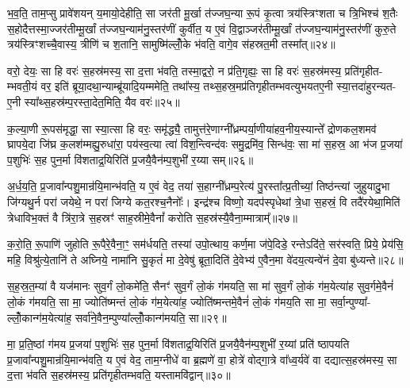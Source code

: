 भ॒व॒ति॒ ताम॒प्सु प्रावे॑शयन् य॒मायो॒देहीति॒ सा जर॑ती मू॒र्खा त॑ज्जघ॒न्या रू॒पं कृ॒त्वा त्रय॑स्त्रिꣳशता च त्रि॒भिश्च॑ श॒तैः स॒होदैत्तस्मा॒ज्जर॑तीम्मू॒र्खां त॑ज्जघ॒न्याम॑नु॒स्तर॑णीं कुर्वीत॒ य ए॒वं वि॒द्वाञ्जर॑तीम्मू॒र्खां त॑ज्जघ॒न्याम॑नु॒स्तर॑णीं कुरु॒ते त्रय॑स्त्रिꣳशच्चै॒वास्य॒ त्रीणि॑ च श॒तानि॒ सामुष्मि॑ल्लोँ॒के भ॑वति॒ वागे॒व स॑हस्रत॒मी तस्मा᳚त्॥२४॥

वरो॒ देयः॒ सा हि वरः॑ स॒हस्र॑मस्य॒ सा द॒त्ता भ॑वति॒ तस्मा॒द्वरो॒ न प्र॑ति॒गृह्यः॒ सा हि वरः॑ स॒हस्र॑मस्य॒ प्रति॑गृहीत- म्भवती॒यं वर॒ इति॑ ब्रूया॒दथा॒न्याम्ब्रू॑यादि॒यम्ममेति॒ तथा᳚स्य॒ तथ्स॒हस्र॒मप्र॑तिगृहीतम्भवत्युभयतए॒नी स्या॒त्तदा॑हुरन्यत- ए॒नी स्या᳚थ्स॒हस्र॑म्प॒रस्ता॒देत॒मिति॒ यैव वरः॑॥२५॥

क॒ल्या॒णी रू॒पस॑मृद्धा॒ सा स्या॒त्सा हि वरः॒ समृ॑द्ध्यै॒ तामुत्त॑रे॒णाग्नी᳚ध्रम्पर्या॒णीया॑हव॒नीय॒स्यान्ते᳚ द्रोणकल॒शमव॑ घ्रापये॒दा जि॑घ्र क॒लश॑म्मह्यु॒रुधा॑रा॒ पय॑स्व॒त्या त्वा॑ विश॒न्त्विन्द॑वः समु॒द्रमि॑व॒ सिन्ध॑वः॒ सा मा॑ स॒हस्र॒ आ भ॑ज प्र॒जया॑ प॒शुभिः॑ स॒ह पुन॒र्मा वि॑शताद्र॒यिरिति॑ प्र॒जयै॒वैन॑म्प॒शुभी॑ र॒य्या सम्॥२६॥

अ॒र्ध॒य॒ति॒ प्र॒जावा᳚न्पशु॒मान्र॑यि॒मान्भ॑वति॒ य ए॒वं वेद॒ तया॑ स॒हाग्नी᳚ध्रम्प॒रेत्य॑ पु॒रस्ता᳚त्प्र॒तीच्यां॒ तिष्ठ॑न्त्यां जुहुयादु॒भा जि॑ग्यथु॒र्न परा॑ जयेथे॒ न परा॑ जिग्ये कत॒रश्च॒नैनोः᳚। इन्द्र॑श्च विष्णो॒ यदप॑स्पृधेथां त्रे॒धा स॒हस्रं॒ वि तदै॑रयेथा॒मिति॑ त्रेधाविभ॒क्तं वै त्रि॑रा॒त्रे स॒हस्रꣳ॑ साह॒स्रीमे॒वैनां᳚ करोति स॒हस्र॑स्यै॒वैना॒म्मात्राम्᳚॥२७॥

क॒रो॒ति॒ रू॒पाणि॑ जुहोति रू॒पैरे॒वैना॒ꣳ॒ सम॑र्धयति॒ तस्या॑ उपो॒त्थाय॒ कर्ण॒मा ज॑पे॒दिडे॒ रन्ते\-ऽदि॑ते॒ सर॑स्वति॒ प्रिये॒ प्रेय॑सि॒ महि॒ विश्रु॑त्ये॒तानि॑ ते अघ्निये॒ नामा॑नि सु॒कृतं॑ मा दे॒वेषु॑ ब्रूता॒दिति॑ दे॒वेभ्य॑ ए॒वैन॒मा वे॑दय॒त्यन्वे॑नं दे॒वा बु॑ध्यन्ते॥२८॥

{\anuvakamend[{ए॒तदे॒तस्यां᳚ वी॒र्य॑मस्य त्रि॒भिश्च॑ द॒त्ता स॑हस्रत॒मी तस्मा॑दे॒व वरः॒ सम्मात्रा॒मेका॒न्नच॑त्वारि॒ꣳ॒शच्च॑॥६॥}]}

स॒ह॒स्र॒त॒म्या॑ वै यज॑मानः सुव॒र्गं लो॒कमे॑ति॒ सैनꣳ॑ सुव॒र्गं लो॒कं ग॑मयति॒ सा मा॑ सुव॒र्गं लो॒कं ग॑म॒येत्या॑ह सुव॒र्गमे॒वैनं॑ लो॒कं ग॑मयति॒ सा मा॒ ज्योति॑ष्मन्तं लो॒कं ग॑म॒येत्या॑ह॒ ज्योति॑ष्मन्तमे॒वैनं॑ लो॒कं ग॑मय॒ति सा मा॒ सर्वा॒न्पुण्या᳚- ल्लोँ॒कान्ग॑म॒येत्या॑ह॒ सर्वा॑ने॒वैन॒म्पुण्या᳚ल्लोँ॒कान्ग॑मयति॒ सा॥२९॥

मा॒ प्र॒ति॒ष्ठां ग॑मय प्र॒जया॑ प॒शुभिः॑ स॒ह पुन॒र्मा वि॑शताद्र॒यिरिति॑ प्र॒जयै॒वैन॑म्प॒शुभी॑ र॒य्यां प्रति॑ ष्ठापयति प्र॒जावा᳚न्पशु॒मान्र॑यि॒मान्भ॑वति॒ य ए॒वं वेद॒ ताम॒ग्नीधे॑ वा ब्र॒ह्मणे॑ वा॒ होत्रे॑ वोद्गा॒त्रे वा᳚ध्व॒र्यवे॑ वा दद्यात्स॒हस्र॑मस्य॒ सा द॒त्ता भ॑वति स॒हस्र॑मस्य॒ प्रति॑गृहीतम्भवति॒ यस्तामवि॑द्वान्॥३०॥

